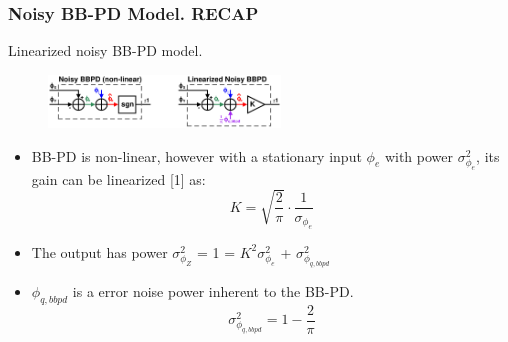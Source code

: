 \documentclass[t, screen, aspectratio=43]{beamer}
\begin{document}
\begin{frame}
	\frametitle{Noisy BB-PD Model. \color{red}RECAP}
	\begin{block}{Linearized noisy BB-PD model.}
	\tiny
	\begin{figure}[htb!]
	    \centering
		\includegraphics[width=0.55\textwidth, angle=0]{bbpd_noise_linearized.pdf}
	\end{figure}
	\begin{itemize}[itemsep=4pt,label=\protect---]
		\item BB-PD is non-linear, however with a stationary input $\phi_e$ with power  $\sigma^2_{\phi_e}$, its gain can be linearized [1] as:
		\tiny
		\begin{equation}
			K = \sqrt{\frac{2}{\pi}}\cdot\frac{1}{\sigma_{\phi_e}}
		\end{equation}
		\item The output has power $\sigma^2_{\phi_Z}$ = 1 = $K^2\sigma^2_{\phi_e}$ + $\sigma^2_{\phi_{q,bbpd}}$
		\item $\phi_{q,bbpd}$ is a error noise power inherent to the BB-PD. 
		\begin{equation}
			\sigma^2_{\phi_{q,bbpd}} = 1 - \frac{2}{\pi}
		\end{equation}
	\end{itemize}

	\end{block}	
\end{frame}
\end{document}
